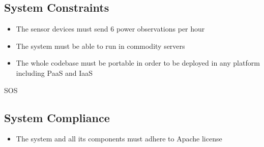 \subsection*{System Constraints}

\begin{itemize}
	\item The sensor devices must send 6 power observations per hour
	\item The system must be able to run in commodity servers 
	\item The whole codebase must be portable in order to be deployed in any platform including PaaS and IaaS
\end{itemize}

SOS

\subsection*{System Compliance}

\begin{itemize}
	\item The system and all its components must adhere to Apache license
\end{itemize}




